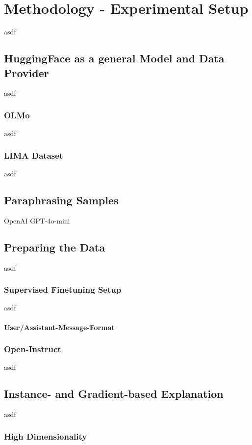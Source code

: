 \chapter{Methodology - Experimental Setup}
asdf

\section{HuggingFace as a general Model and Data Provider}
asdf

\subsection{OLMo}
asdf

\subsection{LIMA Dataset}
asdf

\section{Paraphrasing Samples}\label{sec:paraphrasing_samples}
OpenAI GPT-4o-mini

\section{Preparing the Data}
asdf

\subsection{Supervised Finetuning Setup}
asdf

\subsubsection{User/Assistant-Message-Format}

\subsection{Open-Instruct}
asdf

\section{Instance- and Gradient-based Explanation}
asdf

\subsection{High Dimensionality}\label{subsec:high_dimensionality}

